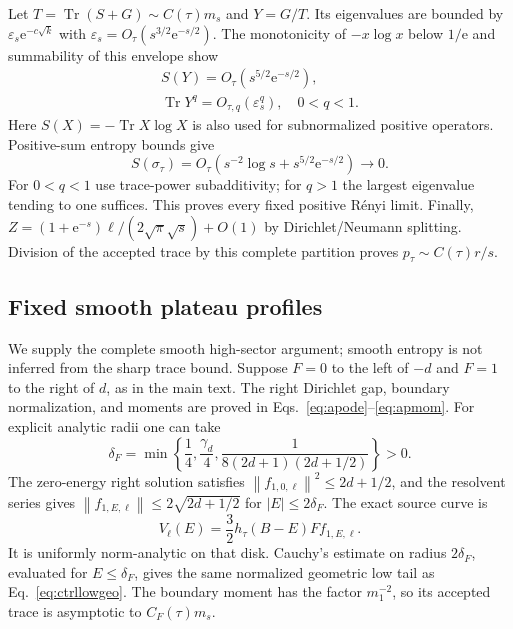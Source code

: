 \documentclass[aps,pra,reprint,superscriptaddress,longbibliography]{revtex4-2}
\newcommand{\Tr}{\operatorname{Tr}}
\newcommand{\ee}{\mathrm e}
\newcommand{\norm}[1]{\left\lVert#1\right\rVert}
\begin{document}
Let $T=\Tr(S+G)\sim C(\tau)m_s$ and $Y=G/T$.
Its eigenvalues are bounded by
$\varepsilon_s\ee^{-c\sqrt k}$ with
$\varepsilon_s=O_\tau(s^{3/2}\ee^{-s/2})$.
The monotonicity of $-x\log x$ below $1/\ee$ and summability
of this envelope show
\begin{equation}
 \begin{gathered}
 S(Y)=O_\tau(s^{5/2}\ee^{-s/2}),\qquad\\
 \Tr Y^q=O_{\tau,q}(\varepsilon_s^q),\quad 0<q<1.
                                                        \label{eq:ctrlhighentropy}
 \end{gathered}
\end{equation}
Here $S(X)=-\Tr X\log X$ is also used for subnormalized positive
operators. Positive-sum entropy bounds give
\begin{equation}
 S(\sigma_\tau)=O_\tau(s^{-2}\log s+s^{5/2}\ee^{-s/2})\to0.
                                                        \label{eq:ctrlentropy}
\end{equation}
For $0<q<1$ use trace-power subadditivity; for $q>1$ the largest
eigenvalue tending to one suffices. This proves every fixed positive
R\'enyi limit. Finally,
$Z=(1+\ee^{-s})\ell/(2\sqrt\pi\sqrt s)+O(1)$ by
Dirichlet/Neumann splitting. Division of the accepted trace by
this complete partition proves $p_\tau\sim C(\tau)r/s$.

\subsection{Fixed smooth plateau profiles}

We supply the complete smooth high-sector argument; smooth entropy
is not inferred from the sharp trace bound. Suppose $F=0$ to the
left of $-d$ and $F=1$ to the right of $d$, as in the main text.
The right Dirichlet gap, boundary normalization, and moments are
proved in Eqs.~\eqref{eq:apode}--\eqref{eq:apmom}.
For explicit analytic radii one can take
\begin{equation}
 \delta_F=\min\left\{\frac14,\frac{\gamma_d}4,
                   \frac1{8(2d+1)(2d+1/2)}\right\}>0.
                                                        \label{eq:ctrldelta}
\end{equation}
The zero-energy right solution satisfies
$\norm{f_{1,0,\ell}}^2\le2d+1/2$, and the resolvent series
gives $\norm{f_{1,E,\ell}}\le2\sqrt{2d+1/2}$ for
$|E|\le2\delta_F$.
The exact source curve is
\begin{equation}
 V_\ell(E)=\frac32h_\tau(B-E)Ff_{1,E,\ell}.              \label{eq:ctrlsmoothsource}
\end{equation}
It is uniformly norm-analytic on that disk. Cauchy's estimate
on radius $2\delta_F$, evaluated for $E\le\delta_F$, gives the
same normalized geometric low tail as Eq.~\eqref{eq:ctrllowgeo}.
The boundary moment has the factor $m_1^{-2}$, so its accepted
trace is asymptotic to $C_F(\tau)m_s$.
\end{document}
